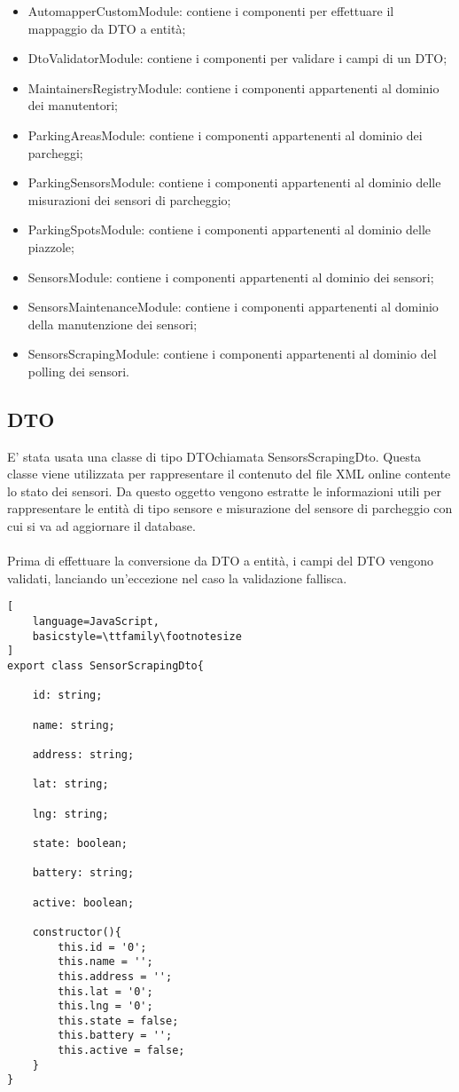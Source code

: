 \begin{itemize}
    \item AutomapperCustomModule: contiene i componenti per effettuare il mappaggio da DTO a entità;
    \item DtoValidatorModule: contiene i componenti per validare i campi di un DTO;
    \item MaintainersRegistryModule: contiene i componenti appartenenti al dominio dei manutentori;
    \item ParkingAreasModule: contiene i componenti appartenenti al dominio dei parcheggi;
    \item ParkingSensorsModule: contiene i componenti appartenenti al dominio delle misurazioni dei sensori di parcheggio;
    \item ParkingSpotsModule: contiene i componenti appartenenti al dominio delle piazzole;
    \item SensorsModule: contiene i componenti appartenenti al dominio dei sensori;
    \item SensorsMaintenanceModule: contiene i componenti appartenenti al dominio della manutenzione dei sensori;
    \item SensorsScrapingModule: contiene i componenti appartenenti al dominio del polling dei sensori.
\end{itemize}

\subsection{DTO}
E' stata usata una classe di tipo \gls{DTO}\glsfirstoccur chiamata SensorsScrapingDto. Questa classe viene utilizzata per rappresentare
il contenuto del file \gls{XML} online contente lo stato dei sensori. Da questo oggetto vengono estratte le informazioni
utili per rappresentare le entità di tipo sensore e misurazione del sensore di parcheggio con cui si va ad aggiornare il database.
\\\\
Prima di effettuare la conversione da \gls{DTO} a entità, i campi del \gls{DTO} vengono validati, lanciando un'eccezione nel caso 
la validazione fallisca.
\\
\begin{lstlisting}[
    language=JavaScript,
    basicstyle=\ttfamily\footnotesize
]
export class SensorScrapingDto{
    
    id: string;

    name: string;

    address: string;

    lat: string;

    lng: string;

    state: boolean;

    battery: string;

    active: boolean;

    constructor(){
        this.id = '0';
        this.name = '';
        this.address = '';
        this.lat = '0';
        this.lng = '0';
        this.state = false;
        this.battery = '';
        this.active = false;
    }
}
\end{lstlisting}
